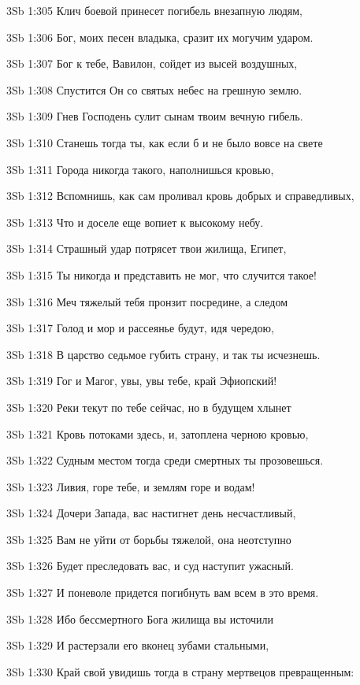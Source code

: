 \vs 3Sb 1:305 Клич боевой принесет погибель внезапную людям, 

\vs 3Sb 1:306 Бог, моих песен владыка, сразит их могучим ударом. 

\vs 3Sb 1:307 Бог к тебе, Вавилон, сойдет из высей воздушных, 

\vs 3Sb 1:308 Спустится Он со святых небес на грешную землю.

\vs 3Sb 1:309 Гнев Господень сулит сынам твоим вечную гибель.

\vs 3Sb 1:310 Станешь тогда ты, как если б и не было вовсе на свете 

\vs 3Sb 1:311 Города никогда такого, наполнишься кровью, 

\vs 3Sb 1:312 Вспомнишь, как сам проливал кровь добрых и справедливых, 

\vs 3Sb 1:313 Что и доселе еще вопиет к высокому небу.

\vs 3Sb 1:314 Страшный удар потрясет твои жилища, Египет, 

\vs 3Sb 1:315 Ты никогда и представить не мог, что случится такое! 

\vs 3Sb 1:316 Меч тяжелый тебя пронзит посредине, а следом 

\vs 3Sb 1:317 Голод и мор и рассеянье будут, идя чередою, 

\vs 3Sb 1:318 В царство седьмое губить страну, и так ты исчезнешь.

\vs 3Sb 1:319 Гог и Магог, увы, увы тебе, край Эфиопский! 

\vs 3Sb 1:320 Реки текут по тебе сейчас, но в будущем хлынет 

\vs 3Sb 1:321 Кровь потоками здесь, и, затоплена черною кровью, 

\vs 3Sb 1:322 Судным местом тогда среди смертных ты прозовешься.

\vs 3Sb 1:323 Ливия, горе тебе, и землям горе и водам!

\vs 3Sb 1:324 Дочери Запада, вас настигнет день несчастливый, 

\vs 3Sb 1:325 Вам не уйти от борьбы тяжелой, она неотступно

\vs 3Sb 1:326 Будет преследовать вас, и суд наступит ужасный.

\vs 3Sb 1:327 И поневоле придется погибнуть вам всем в это время.

\vs 3Sb 1:328 Ибо бессмертного Бога жилища вы источили

\vs 3Sb 1:329 И растерзали его вконец зубами стальными, 

\vs 3Sb 1:330 Край свой увидишь тогда в страну мертвецов превращенным:

